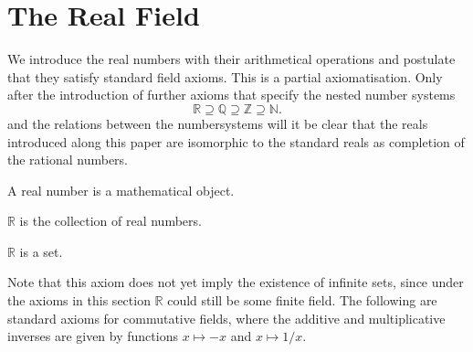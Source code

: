 \documentclass{article}
\begin{document}
\section{The Real Field}

We introduce the real numbers with their
arithmetical operations and postulate that
they satisfy standard field axioms. This is a partial
axiomatisation.
Only after the introduction
of further axioms that specify the nested number systems
\[ \mathbb{R} \supseteq \mathbb{Q} \supseteq \mathbb{Z}
\supseteq \mathbb{N}. \]
and the relations between the numbersystems will it be clear
that the reals introduced along this paper are isomorphic to
the standard reals as completion of the rational numbers.

\begin{forthel}

\begin{signature}
A real number is a mathematical object.
\end{signature}

\begin{definition}
$\mathbb{R}$ is the collection of real numbers.
\end{definition}

\begin{axiom}
$\mathbb{R}$ is a set.
\end{axiom}
\end{forthel}
%
Note that this axiom does not yet imply the existence of infinite sets,
since under the axioms in this section $\mathbb{R}$ could still be some finite
field. The following are standard axioms for commutative fields, where the
additive and multiplicative inverses are given by functions
$x \mapsto -x$ and $x \mapsto 1/x$.
%
\end{document}
